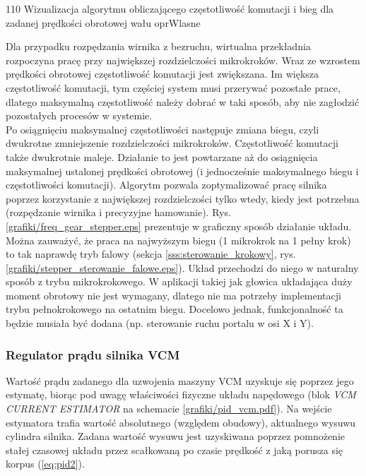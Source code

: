 	{110}
	{Wizualizacja algorytmu obliczającego częstotliwość komutacji i bieg dla zadanej prędkości obrotowej wału}
	{oprWlasne}

Dla przypadku rozpędzania wirnika z bezruchu, wirtualna przekładnia rozpoczyna pracę przy największej rozdzielczości mikrokroków. Wraz ze wzrostem prędkości obrotowej częstotliwość komutacji jest zwiększana. Im większa częstotliwość komutacji, tym częściej system musi przerywać pozostałe prace, dlatego maksymalną częstotliwość należy dobrać w taki sposób, aby nie zagłodzić pozostałych procesów w systemie. \\

Po osiągnięciu maksymalnej częstotliwości następuje zmiana biegu, czyli dwukrotne zmniejszenie rozdzielczości mikrokroków. Częstotliwość komutacji także dwukrotnie maleje. Działanie to jest powtarzane aż do osiągnięcia maksymalnej ustalonej prędkości obrotowej (i jednocześnie maksymalnego biegu i częstotliwości komutacji). Algorytm pozwala zoptymalizować pracę silnika poprzez korzystanie \linebreak z największej rozdzielczości tylko wtedy, kiedy jest potrzebna (rozpędzanie wirnika i precyzyjne hamowanie). Rys. \ref{grafiki/freq_gear_stepper.eps} prezentuje w graficzny sposób działanie układu. \\

Można zauważyć, że praca na najwyższym biegu (1 mikrokrok na 1 pełny krok) to tak naprawdę tryb falowy (sekcja \ref{sss:sterowanie_krokowy}, rys. \ref{grafiki/stepper_sterowanie_falowe.eps}). Układ przechodzi do niego w naturalny sposób z trybu mikrokrokowego. W aplikacji takiej jak głowica układająca duży moment obrotowy nie jest wymagany, dlatego nie ma potrzeby implementacji trybu pełnokrokowego na ostatnim biegu. Docelowo jednak, funkcjonalność ta będzie musiała być dodana (np. sterowanie ruchu portalu w osi X i Y).

\subsubsection{Regulator prądu silnika VCM}

Wartość prądu zadanego dla uzwojenia maszyny VCM uzyskuje się poprzez jego estymatę, biorąc pod uwagę właściwości fizyczne układu napędowego (blok {\it VCM CURRENT ESTIMATOR} na schemacie \ref{grafiki/pid_vcm.pdf}). Na wejście estymatora trafia wartość absolutnego (względem obudowy), aktualnego wysuwu cylindra silnika. Zadana wartość wysuwu jest uzyskiwana poprzez pomnożenie stałej czasowej układu przez scałkowaną po czasie prędkość z jaką porusza się korpus (\ref{eq:pid2}).

